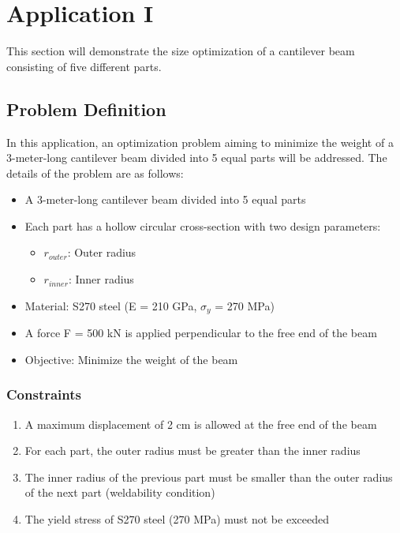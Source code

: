 \section{Application I}
This section will demonstrate the size optimization of a cantilever beam consisting of five different parts.


\subsection{Problem Definition}
In this application, an optimization problem aiming to minimize the weight of a 3-meter-long cantilever beam divided into 5 equal parts will be addressed. The details of the problem are as follows:

\begin{itemize}
    \item A 3-meter-long cantilever beam divided into 5 equal parts
    \item Each part has a hollow circular cross-section with two design parameters:
    \begin{itemize}
        \item $r_{outer}$: Outer radius
        \item $r_{inner}$: Inner radius
    \end{itemize}
    \item Material: S270 steel (E = 210 GPa, $\sigma_y$ = 270 MPa)
    \item A force F = 500 kN is applied perpendicular to the free end of the beam
    \item Objective: Minimize the weight of the beam
\end{itemize}

\subsubsection{Constraints}
\begin{enumerate}
    \item A maximum displacement of 2 cm is allowed at the free end of the beam
    \item For each part, the outer radius must be greater than the inner radius
    \item The inner radius of the previous part must be smaller than the outer radius of the next part (weldability condition)
    \item The yield stress of S270 steel (270 MPa) must not be exceeded
\end{enumerate}

